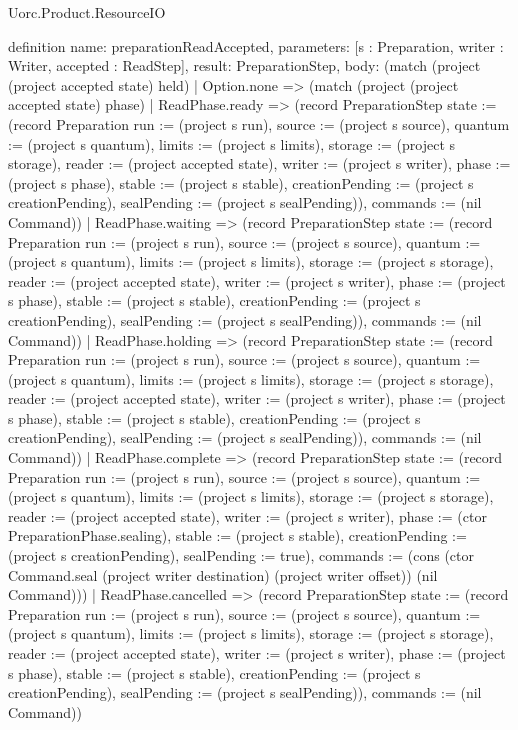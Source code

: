 \begin{lexlean}{Uorc.Product.ResourceIO}
\begin{semanticmodule}
definition{
  name: preparationReadAccepted,
  parameters: [s : Preparation, writer : Writer, accepted : ReadStep],
  result: PreparationStep,
  body: (match (project (project accepted state) held)
    | Option.none => (match (project (project accepted state) phase)
      | ReadPhase.ready => (record PreparationStep {state := (record Preparation {run := (project s run), source := (project s source), quantum := (project s quantum), limits := (project s limits), storage := (project s storage), reader := (project accepted state), writer := (project s writer), phase := (project s phase), stable := (project s stable), creationPending := (project s creationPending), sealPending := (project s sealPending)}), commands := (nil Command)})
      | ReadPhase.waiting => (record PreparationStep {state := (record Preparation {run := (project s run), source := (project s source), quantum := (project s quantum), limits := (project s limits), storage := (project s storage), reader := (project accepted state), writer := (project s writer), phase := (project s phase), stable := (project s stable), creationPending := (project s creationPending), sealPending := (project s sealPending)}), commands := (nil Command)})
      | ReadPhase.holding => (record PreparationStep {state := (record Preparation {run := (project s run), source := (project s source), quantum := (project s quantum), limits := (project s limits), storage := (project s storage), reader := (project accepted state), writer := (project s writer), phase := (project s phase), stable := (project s stable), creationPending := (project s creationPending), sealPending := (project s sealPending)}), commands := (nil Command)})
      | ReadPhase.complete => (record PreparationStep {state := (record Preparation {run := (project s run), source := (project s source), quantum := (project s quantum), limits := (project s limits), storage := (project s storage), reader := (project accepted state), writer := (project s writer), phase := (ctor PreparationPhase.sealing), stable := (project s stable), creationPending := (project s creationPending), sealPending := true}), commands := (cons (ctor Command.seal (project writer destination) (project writer offset)) (nil Command))})
      | ReadPhase.cancelled => (record PreparationStep {state := (record Preparation {run := (project s run), source := (project s source), quantum := (project s quantum), limits := (project s limits), storage := (project s storage), reader := (project accepted state), writer := (project s writer), phase := (project s phase), stable := (project s stable), creationPending := (project s creationPending), sealPending := (project s sealPending)}), commands := (nil Command)})
}
\end{semanticmodule}
\end{lexlean}
